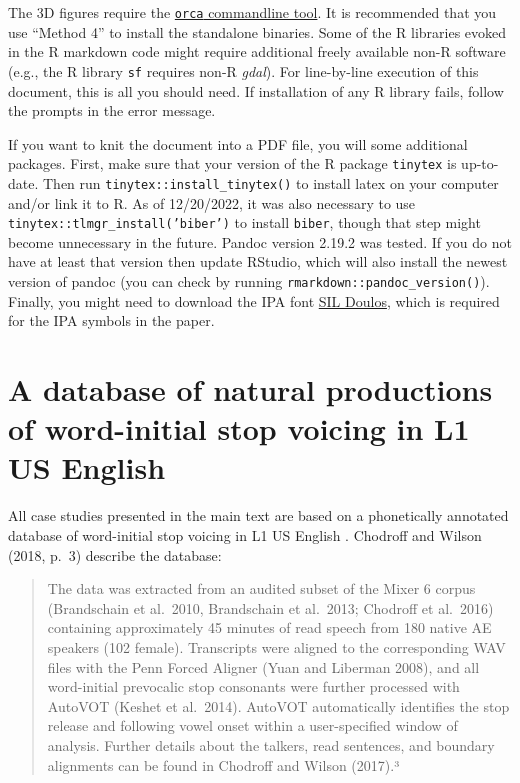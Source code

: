 \documentclass[
  11pt,
  man,floatsintext]{apa6}
\begin{document}
The 3D figures require the \href{https://github.com/plotly/orca\#installation}{\texttt{orca} commandline tool}. It is recommended that you use ``Method 4'' to install the standalone binaries. Some of the R libraries evoked in the R markdown code might require additional freely available non-R software (e.g., the R library \texttt{sf} requires non-R \emph{gdal}). For line-by-line execution of this document, this is all you should need. If installation of any R library fails, follow the prompts in the error message.

If you want to knit the document into a PDF file, you will some additional packages. First, make sure that your version of the R package \texttt{tinytex} is up-to-date. Then run \texttt{tinytex::install\_tinytex()} to install latex on your computer and/or link it to R. As of 12/20/2022, it was also necessary to use \texttt{tinytex::tlmgr\_install('biber')} to install \texttt{biber}, though that step might become unnecessary in the future. Pandoc version 2.19.2 was tested. If you do not have at least that version then update RStudio, which will also install the newest version of pandoc (you can check by running \texttt{rmarkdown::pandoc\_version()}). Finally, you might need to download the IPA font \href{https://software.sil.org/doulos/download/}{SIL Doulos}, which is required for the IPA symbols in the paper.

\hypertarget{sec:SI-chodroff}{%
\section{\texorpdfstring{A database of natural productions of word-initial stop voicing in L1 US English \autocite{chodroff-wilson2018}}{A database of natural productions of word-initial stop voicing in L1 US English {[}@chodroff-wilson2018{]}}}\label{sec:SI-chodroff}}

All case studies presented in the main text are based on a phonetically annotated database of word-initial stop voicing in L1 US English \autocite{chodroff-wilson2018}. Chodroff and Wilson (2018, p.~3) describe the database:

\begin{quote}
The data was extracted from an audited subset of the Mixer 6 corpus (Brandschain et al.~2010, Brandschain
et al.~2013; Chodroff et al.~2016) containing approximately 45 minutes of read speech from 180 native AE
speakers (102 female). Transcripts were aligned to the corresponding WAV files with the Penn Forced Aligner
(Yuan and Liberman 2008), and all word-initial prevocalic stop consonants were further processed with
AutoVOT (Keshet et al.~2014). AutoVOT automatically identifies the stop release and following vowel onset
within a user-specified window of analysis. Further details about the talkers, read sentences, and boundary
alignments can be found in Chodroff and Wilson (2017).³
\end{quote}
\end{document}
